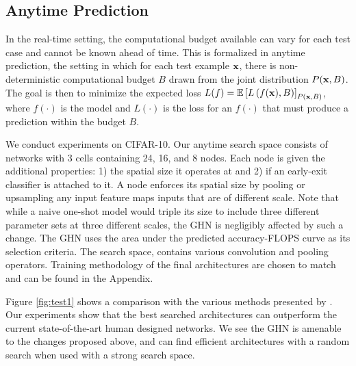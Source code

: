 \subsection{Anytime Prediction}
In the real-time setting, the computational budget available can vary for each test case and cannot
be known ahead of time. This is formalized in anytime prediction, \citep{grubb2012speedboost}  the
setting in which for each test example ${\mathbf{x}}$, there is non-deterministic computational budget $B$
drawn from the joint distribution $P({\mathbf{x}}, B)$. The goal is then to minimize the expected loss $L(f)
= \mathbb{E}\left[ L\left( f({\mathbf{x}}), B \right)\right]_{P({\mathbf{x}}, B)}$, where $f(\cdot)$ is the model and
$L(\cdot)$ is the loss for an $f(\cdot)$ that must produce a prediction within the budget $B$.

We conduct experiments on CIFAR-10. Our anytime search space consists of networks with 3 cells
containing 24, 16, and 8 nodes. Each node is given the additional properties: 1) the spatial size it
operates at and 2) if an early-exit classifier is attached to it. A node enforces its spatial size
by pooling or upsampling any input feature maps inputs that are of different scale. Note that while
a naive one-shot model would triple its size to include three different parameter sets at three
different scales, the GHN is negligibly affected by such a change. The GHN uses the area under the
predicted accuracy-FLOPS curve as its selection criteria. The search space, contains various
convolution and pooling operators. Training methodology of the final architectures are chosen to
match \cite{huang2017multi} and can be found in the Appendix.

Figure \ref{fig:test1} shows a comparison with the various methods presented by
\cite{huang2017multi}. Our experiments show that the best searched architectures can outperform the
current state-of-the-art human designed networks. We see the GHN is amenable to the changes proposed
above, and can find efficient architectures with a random search when used with a strong search
space.

